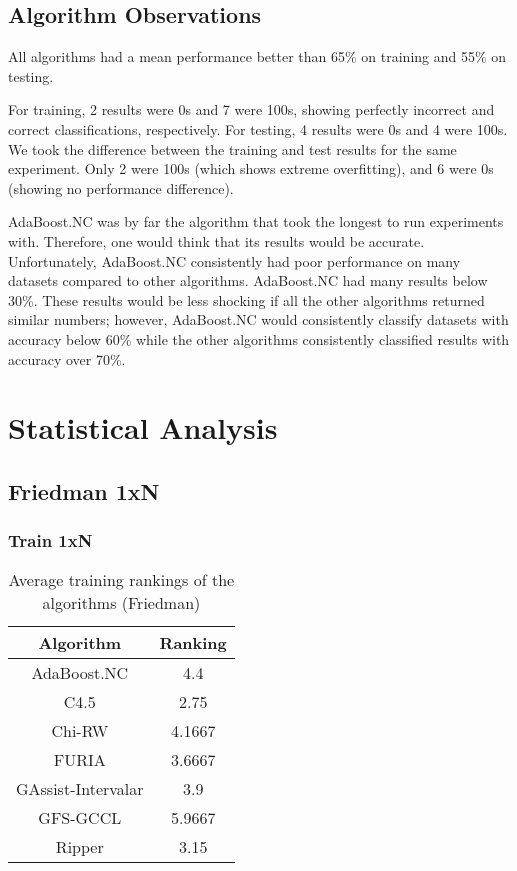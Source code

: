 \documentclass[a4paper,11pt]{article}
\begin{document}
\subsection{Algorithm Observations}
All algorithms had a mean performance better than 65\% on training and 55\% on testing.
\par For training, 2 results were 0s and 7 were 100s, showing perfectly incorrect and correct classifications, respectively. For testing, 4 results were 0s and 4 were 100s. We took the difference between the training and test results for the same experiment. Only 2 were 100s (which shows extreme overfitting), and 6 were 0s (showing no performance difference).
\par AdaBoost.NC was by far the algorithm that took the longest to run experiments with. Therefore, one would think that its results would be accurate. Unfortunately, AdaBoost.NC consistently had poor performance on many datasets compared to other algorithms. AdaBoost.NC had many results below 30\%. These results would be less shocking if all the other algorithms returned similar numbers; however, AdaBoost.NC would consistently classify datasets with accuracy below 60\% while the other algorithms consistently classified results with accuracy over 70\%.

\section{Statistical Analysis}
\subsection{Friedman 1xN}

\subsubsection{Train 1xN}

\begin{table}[!htp]
\centering
\begin{tabular}{|c|c|}\hline
Algorithm&Ranking\\\hline
 AdaBoost.NC &4.4\\ C4.5 &2.75\\ Chi-RW &4.1667\\ FURIA &3.6667\\ GAssist-Intervalar &3.9\\ GFS-GCCL &5.9667\\ Ripper&3.15\\\hline\end{tabular}
\caption{Average training rankings of the algorithms (Friedman)}
\end{table}
\end{document}
